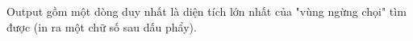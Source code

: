 Output gồm một dòng duy nhất là diện tích lớn nhất của "vùng ngừng chọi" tìm được (in ra một chữ số sau dấu phẩy).